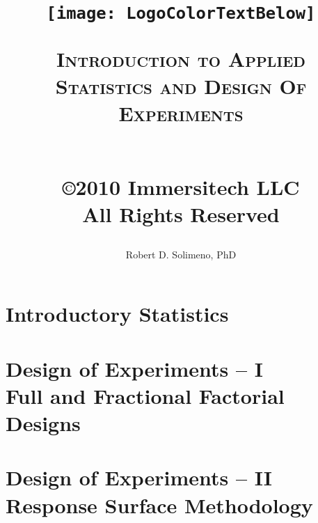 \documentclass[12 pt, letterpaper]{book}
\begin{document}
\title{
\begin{center}
\texttt{[image: LogoColorTextBelow]}
\end{center}
\textsc{Introduction to Applied Statistics and Design Of Experiments}
\bigskip
\author{Robert D. Solimeno, PhD}\\
\copyright 2010 Immersitech LLC\\
All Rights Reserved}
\date{}
\maketitle


\tableofcontents
\listoffigures
\listoftables
{}

\part{Introductory Statistics}


\part{Design of Experiments -- I\\
Full and Fractional Factorial Designs}


\part{Design of Experiments -- II\\
Response Surface Methodology}






\cleardoublepage
{}

\appendix


\cleardoublepage
{}



\clearpage


\clearpage


\printindex
\end{document}
